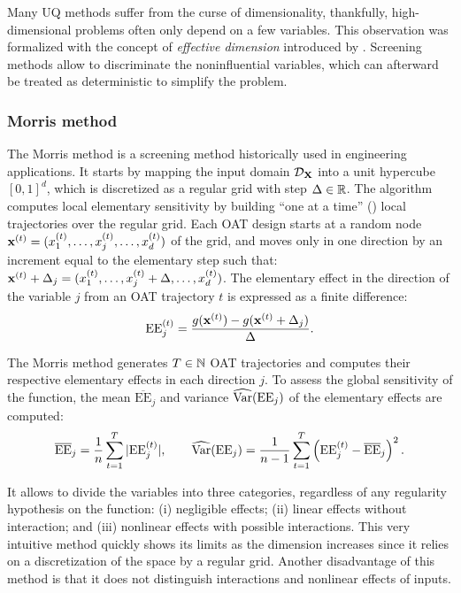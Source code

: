 Many UQ methods suffer from the curse of dimensionality, thankfully, high-dimensional problems often only depend on a few variables. 
This observation was formalized with the concept of \textit{effective dimension} introduced by \citet{owen_2003}. 
Screening methods allow to discriminate the noninfluential variables, which can afterward be treated as deterministic to simplify the problem.

\subsubsection{Morris method}

The Morris method \citep{morris_1991} is a screening method historically used in engineering applications. 
It starts by mapping the input domain $\mathcal{D}_{{\bf X}}$ into a unit hypercube $[0, 1]^d$, which is discretized as a regular grid with step $\Delta \in \mathbb{R}$. 
The algorithm computes local elementary sensitivity by building ``one at a time'' () local trajectories over the regular grid. 
Each OAT design starts at a random node ${\bf x}^{(t)} = (x^{(t)}_1, \dots, x^{(t)}_j,\dots, x^{(t)}_d)$ of the grid, and moves only in one direction by an increment equal to the elementary step such that: ${\bf x}^{(t)} + \Delta_j = (x^{(t)}_1, \dots, x^{(t)}_j + \Delta ,\dots, x^{(t)}_d)$. 
The elementary effect in the direction of the variable $j$ from an OAT trajectory $t$ is expressed as a finite difference: 
\begin{equation}
    \mathrm{EE}_j^{(t)} = \frac{g({\bf x}^{(t)}) - g({\bf x}^{(t)} + \Delta_j)}{\Delta}.
    \label{eq:eeffect}
\end{equation}

The Morris method generates $T\in\mathbb{N}$ OAT trajectories and computes their respective elementary effects in each direction $j$. 
To assess the global sensitivity of the function, the mean $\overline{\mathrm{EE}}_j$ and variance $\widehat{\operatorname{Var}}(\mathrm{EE}_j)$ of the elementary effects are computed: 
\begin{equation}
    \overline{\mathrm{EE}}_j = \frac1n \sum_{t=1}^{T} |\mathrm{EE}_j^{(t)}|, \qquad 
    \widehat{\operatorname{Var}}(\mathrm{EE}_j) = \frac{1}{n-1} \sum_{t=1}^{T} \left(\mathrm{EE}_j^{(t)} - \overline{\mathrm{EE}}_j\right)^2.
\end{equation}  


It allows to divide the variables into three categories, regardless of any regularity hypothesis on the function: 
(i) negligible effects; (ii) linear effects without interaction; and (iii) nonlinear effects with possible interactions. 
This very intuitive method quickly shows its limits as the dimension increases since it relies on a discretization of the space by a regular grid. 
Another disadvantage of this method is that it does not distinguish interactions and nonlinear effects of inputs.


